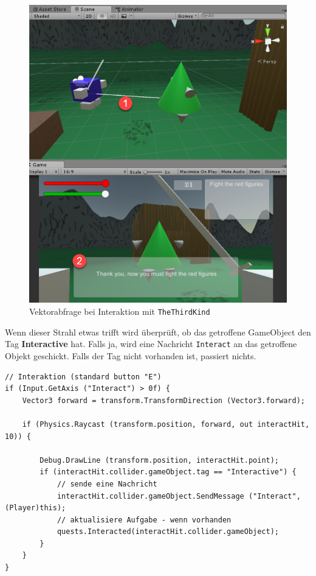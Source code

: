 \begin{figure}[H]
\includegraphics[scale=0.5]{screenshots/raycastthirdkind.png}
\caption{Vektorabfrage bei Interaktion mit \lstinline{TheThirdKind}}
\end{figure}

Wenn dieser Strahl etwas trifft wird überprüft, ob das getroffene GameObject den Tag \textbf{Interactive} hat. Falls ja, wird eine Nachricht \lstinline{Interact} an das getroffene Objekt geschickt. Falls der Tag nicht vorhanden ist, passiert nichts.

\begin{lstlisting}[caption={Auslösen der Interaktion}]
// Interaktion (standard button "E")
if (Input.GetAxis ("Interact") > 0f) {
	Vector3 forward = transform.TransformDirection (Vector3.forward);

	if (Physics.Raycast (transform.position, forward, out interactHit, 10)) {	
		
		Debug.DrawLine (transform.position, interactHit.point);
		if (interactHit.collider.gameObject.tag == "Interactive") {
			// sende eine Nachricht
			interactHit.collider.gameObject.SendMessage ("Interact", (Player)this);
			// aktualisiere Aufgabe - wenn vorhanden
			quests.Interacted(interactHit.collider.gameObject);
		}
	}	
}
\end{lstlisting}

